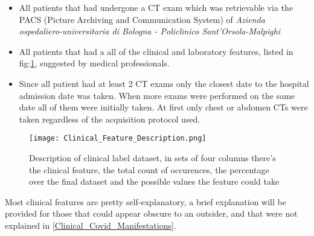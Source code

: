 \begin{itemize}
\item All patients that had undergone a CT exam which was retrievable via the PACS (Picture Archiving and Communication System) of \textit{Azienda ospedaliero-universitaria di Bologna - Policlinico Sant'Orsola-Malpighi}
\item All patients that had a all of the clinical and laboratory features, listed in fig:\ref{fig:ClinicalFeatures}, suggested by medical professionals.
\item Since all patient had at least 2 CT exams only the closest date to the hospital admission date was taken. When more exams were performed on the same date all of them were initially taken. At first only chest or abdomen CTs were taken regardless of the acquisition protocol used.
\end{itemize}

\begin{figure}[H]
  		\texttt{[image: Clinical\_Feature\_Description.png]}
        \caption{Description of clinical label dataset, in sets of four columns there's the clinical feature, the total count of occurences, the percentage over the final dataset and the possible values the feature could take \label{fig:ClinicalFeatures}}
\end{figure}

Most clinical features are pretty self-explanatory, a brief explanation will be provided for those that could appear obscure to an outsider, and that were not explained in \ref{Clinical_Covid_Manifestations}.

